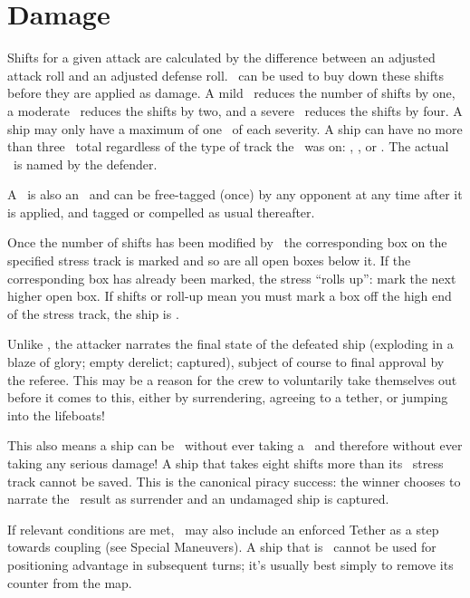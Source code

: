 \section{Damage}\label{sec:Damage}
\vfil

Shifts for a given attack are calculated by the difference between an adjusted attack roll and an adjusted defense roll.
%
\Consequences\ can be used to buy down these shifts before they are applied as damage. A mild \Consequence\ reduces the number of shifts by one, a moderate \Consequence\ reduces the shifts by two, and a severe \Consequence\ reduces the shifts by four. A ship may only have a maximum of one \Consequence\ of each severity. A ship can have no more than three \Consequences\ total regardless of the type of track the \Consequence\ was on: \Frame, \Data, or \Heat. The actual \Consequence\ is named by the defender.

A \Consequence\ is also an \Aspect\ and can be free-tagged (once) by any opponent at any time after it is applied, and tagged or compelled as usual thereafter.

Once the number of shifts has been modified by \Consequences\, the corresponding box on the specified stress track is marked and so are all open boxes below it. If the corresponding box has already been marked, the stress ``rolls up'': mark the next higher open box. If shifts or roll-up mean you must mark a box off the high end of the stress track, the ship is \TakenOut.

Unlike \Consequences, the attacker narrates the final state of the defeated ship (exploding in a blaze of glory; empty derelict; captured), subject of course to final approval by the referee. This may be a reason for the crew to voluntarily take themselves out before it comes to this, either by surrendering, agreeing to a tether, or jumping into the lifeboats!

This also means a ship can be \TakenOut\ without ever taking a \Consequence\ and therefore without ever taking any serious damage! A ship that takes eight shifts more than its \Frame\ stress track cannot be saved. This is the canonical piracy success: the winner chooses to narrate the \TakenOut\ result as surrender and an undamaged ship is captured.

If relevant conditions are met, \TakenOut\ may also include an enforced Tether as a step towards coupling (see Special Maneuvers). A ship that is \TakenOut\ cannot be used for positioning advantage in subsequent turns; it's usually best simply to remove its counter from the map.

